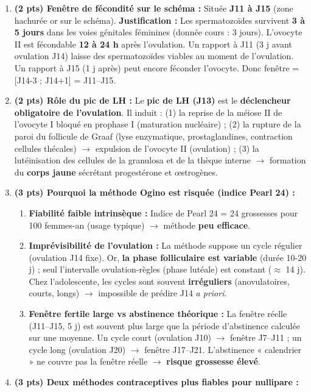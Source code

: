 \documentclass[11pt]{article}
\begin{document}
\begin{corrige}
\begin{enumerate}[itemsep=6pt]
\begin{popfigure}
\end{popfigure}
\item \textbf{(2 pts) Fenêtre de fécondité sur le schéma :}
Située \textbf{J11 à J15} (zone hachurée or sur le schéma).
\textbf{Justification :} Les spermatozoïdes survivent \textbf{3 à 5 jours} dans les voies génitales féminines (donnée cours : 3 jours). L'ovocyte II est fécondable \textbf{12 à 24 h} après l'ovulation. Un rapport à J11 (3 j avant ovulation J14) laisse des spermatozoïdes viables au moment de l'ovulation. Un rapport à J15 (1 j après) peut encore féconder l'ovocyte. Donc fenêtre = [J14-3 ; J14+1] = J11--J15.
\item \textbf{(2 pts) Rôle du pic de LH :}
Le \textbf{pic de LH (J13)} est le \textbf{déclencheur obligatoire de l'ovulation}. Il induit : (1) la reprise de la méiose II de l'ovocyte I bloqué en prophase I (maturation nucléaire) ; (2) la rupture de la paroi du follicule de Graaf (lyse enzymatique, prostaglandines, contraction cellules thécales) $\rightarrow$ expulsion de l'ovocyte II (ovulation) ; (3) la lutéinisation des cellules de la granulosa et de la thèque interne $\rightarrow$ formation du \textbf{corps jaune} sécrétant progestérone et œstrogènes.
\item \textbf{(3 pts) Pourquoi la méthode Ogino est risquée (indice Pearl 24) :}
\begin{enumerate}
\item \textbf{Fiabilité faible intrinsèque :} Indice de Pearl 24 = 24 grossesses pour 100 femmes-an (usage typique) $\rightarrow$ méthode \textbf{peu efficace}.
\item \textbf{Imprévisibilité de l'ovulation :} La méthode suppose un cycle régulier (ovulation J14 fixe). Or, \textbf{la phase folliculaire est variable} (durée 10-20 j) ; seul l'intervalle ovulation-règles (phase lutéale) est constant ($\approx$ 14 j). Chez l'adolescente, les cycles sont souvent \textbf{irréguliers} (anovulatoires, courts, longs) $\rightarrow$ impossible de prédire J14 \emph{a priori}.
\item \textbf{Fenêtre fertile large vs abstinence théorique :} La fenêtre réelle (J11--J15, 5 j) est souvent plus large que la période d'abstinence calculée sur une moyenne. Un cycle court (ovulation J10) $\rightarrow$ fenêtre J7--J11 ; un cycle long (ovulation J20) $\rightarrow$ fenêtre J17--J21. L'abstinence « calendrier » ne couvre pas la fenêtre réelle $\rightarrow$ \textbf{risque grossesse élevé}.
\end{enumerate}
\item \textbf{(3 pts) Deux méthodes contraceptives plus fiables pour nullipare :}

\end{enumerate}
\end{corrige}
\end{document}
